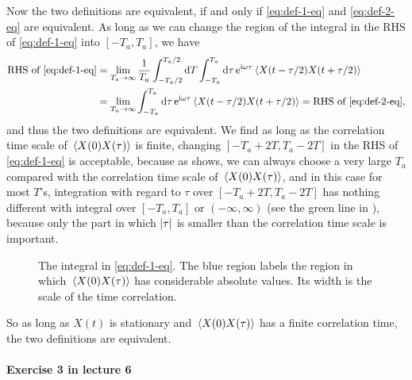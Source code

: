 \documentclass[hyperref, a4paper]{article}
\newcommand*{\ii}{\mathrm{i}}
\newcommand*{\ee}{\mathrm{e}}
\begin{document}
Now the two definitions are equivalent, 
if and only if \eqref{eq:def-1-eq} and \eqref{eq:def-2-eq} are equivalent.
As long as we can change the region of the integral in the RHS of \eqref{eq:def-1-eq}
into $[- T_a, T_a]$, we have
\[
    \begin{aligned}
        \text{RHS of \eqref{eq:def-1-eq}} &= 
        \lim_{T_a \to \infty} \frac{1}{T_a} \int_{- T_a / 2}^{T_a / 2} \dd{T} 
        \int_{- T_a}^{T_a} \dd{\tau} \ee^{\ii \omega \tau}
        \expval*{X(t - \tau / 2) X(t + \tau / 2)} \\
        &= \lim_{T_a \to \infty} \int_{- T_a}^{T_a} \dd{\tau} \ee^{\ii \omega \tau}
        \expval*{X(t - \tau / 2) X(t + \tau / 2)} = \text{RHS of \eqref{eq:def-2-eq}},
    \end{aligned}
\]
and thus the two definitions are equivalent.
We find as long as the correlation time scale of $\expval*{X(0) X(\tau)}$ is finite,
changing $[- T_a + 2T, T_a - 2T]$ in the RHS of \eqref{eq:def-1-eq} is acceptable,
because as  shows,
we can always choose a very large $T_a$ compared with the correlation time scale of $\expval*{X(0) X(\tau)}$,
and in this case for most $T$'s,
integration with regard to $\tau$ over $[- T_a + 2T, T_a - 2T]$ 
has nothing different with integral over $[-T_a, T_a]$ or $(-\infty, \infty)$ 
(see the green line in ),
because only the part in which $\abs{\tau}$ is smaller than the correlation time scale 
is important.

\begin{figure}
    \centering
    
    \caption{The integral in \eqref{eq:def-1-eq}. 
    The blue region labels the region in which $\expval*{X(0) X(\tau)}$ has 
    considerable absolute values.
    Its width is the scale of the time correlation.} 
    \label{fig:spectral-density-approx}
\end{figure}

So as long as $X(t)$ is stationary and $\expval*{X(0) X(\tau)}$ has a finite correlation time,
the two definitions are equivalent.

\paragraph{Exercise 3 in lecture 6}
\end{document}
